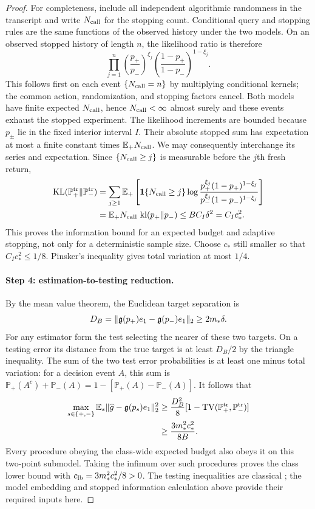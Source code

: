 \documentclass[11pt]{article}
\newcommand{\E}{\mathbb E}
\newcommand{\1}{\mathbf 1}
\DeclarePairedDelimiter{\norm}{\lVert}{\rVert}
\begin{document}
\begin{proof}
For completeness, include all independent algorithmic randomness in the transcript and write $N_{\rm call}$ for the stopping count. Conditional query and stopping rules are the same functions of the observed history under the two models. On an observed stopped history of length $n$, the likelihood ratio is therefore
\[
 \prod_{j=1}^n
 \left(\frac{p_+}{p_-}\right)^{\xi_j}
 \left(\frac{1-p_+}{1-p_-}\right)^{1-\xi_j}.
\]
This follows first on each event $\{N_{\rm call}=n\}$ by multiplying conditional kernels; the common action, randomization, and stopping factors cancel. Both models have finite expected $N_{\rm call}$, hence $N_{\rm call}<\infty$ almost surely and these events exhaust the stopped experiment. The likelihood increments are bounded because $p_\pm$ lie in the fixed interior interval $I$. Their absolute stopped sum has expectation at most a finite constant times $\E_+N_{\rm call}$. We may consequently interchange its series and expectation. Since $\{N_{\rm call}\ge j\}$ is measurable before the $j$th fresh return,
\begin{align}
 \operatorname{KL}(\mathbb P_+^{\rm tr}\Vert\mathbb P_-^{\rm tr})
 &=\sum_{j\ge1}\E_+\left[\1\{N_{\rm call}\ge j\}
 \log\frac{p_+^{\xi_j}(1-p_+)^{1-\xi_j}}
 {p_-^{\xi_j}(1-p_-)^{1-\xi_j}}\right]\notag\\
 &=\E_+N_{\rm call}\,\operatorname{kl}(p_+\Vert p_-)
 \le BC_I\delta^2=C_Ic_*^2.\label{eq:stopped-kl}
\end{align}
This proves the information bound for an expected budget and adaptive stopping, not only for a deterministic sample size. Choose $c_*$ still smaller so that $C_Ic_*^2\le1/8$. Pinsker's inequality gives total variation at most $1/4$.

\paragraph{Step 4: estimation-to-testing reduction.}
By the mean value theorem, the Euclidean target separation is
\[
 D_B=\norm{\mathfrak g(p_+)e_1-\mathfrak g(p_-)e_1}_2
 \ge 2m_*\delta.
\]
For any estimator form the test selecting the nearer of these two targets. On a testing error its distance from the true target is at least $D_B/2$ by the triangle inequality. The sum of the two test error probabilities is at least one minus total variation: for a decision event $A$, this sum is $\mathbb P_+(A^c)+\mathbb P_-(A)=1-[\mathbb P_+(A)-\mathbb P_-(A)]$. It follows that
\begin{align*}
 \max_{s\in\{+,-\}}\E_s\norm{\widehat g-\mathfrak g(p_s)e_1}_2^2
 &\ge\frac{D_B^2}{8}
 [1-\operatorname{TV}(\mathbb P_+^{\rm tr},\mathbb P_-^{\rm tr})]\\
 &\ge\frac{3m_*^2c_*^2}{8B}.
\end{align*}
Every procedure obeying the class-wide expected budget also obeys it on this two-point submodel. Taking the infimum over such procedures proves the class lower bound with $c_{\rm lb}=3m_*^2c_*^2/8>0$. The testing inequalities are classical \citep{tsybakov2009introduction}; the model embedding and stopped information calculation above provide their required inputs here.


\end{proof}
\end{document}
